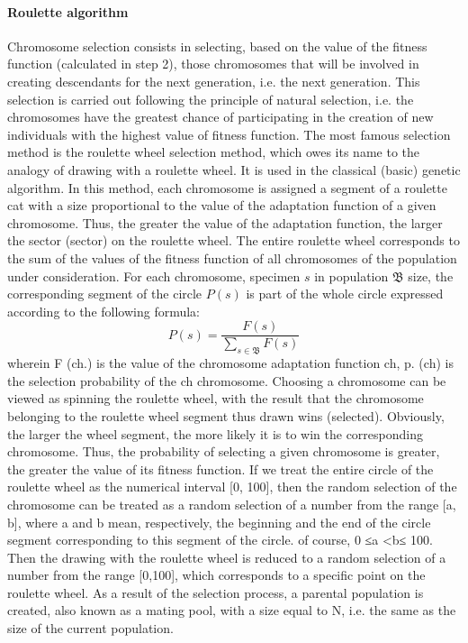 \paragraph{Roulette algorithm} 
Chromosome selection consists in selecting, based on the value of the fitness function 
(calculated in step 2), those chromosomes that will be involved in creating descendants for 
the next generation, i.e. the next generation. 
This selection is carried out following the principle of natural selection, i.e. the 
chromosomes have the greatest chance of participating in the creation of new individuals
with the highest value of fitness function. The most famous selection method is the roulette 
wheel selection method, which owes its name to the analogy of drawing with a roulette wheel. 
It is used in the classical (basic) genetic algorithm. In this method, each chromosome is 
assigned a segment of a roulette cat with a size proportional to the value of the adaptation 
function of a given chromosome. 
Thus, the greater the value of the adaptation function, the larger the sector (sector) on 
the roulette wheel. 
The entire roulette wheel corresponds to the sum of the values of the fitness function of 
all chromosomes of the population under consideration. For each chromosome, 
specimen $s$ in population $\mathfrak{B}$ size, the corresponding segment of the 
circle $P(s)$ is part of the whole circle expressed according to the following formula:
\begin{equation}
	P(s) = \frac{F(s)}{\sum_{s \in \mathfrak{B}}F(s)}
\end{equation}
wherein F (ch.) is the value of the chromosome adaptation function ch, p. (ch) is 
the selection probability of the ch chromosome. 
Choosing a chromosome can be viewed as spinning the roulette wheel, with the result that
the chromosome belonging to the roulette wheel segment thus drawn wins (selected). 
Obviously, the larger the wheel segment, the more likely it is to win the corresponding 
chromosome. 
Thus, the probability of selecting a given chromosome is greater, the greater the value 
of its fitness function. 
If we treat the entire circle of the roulette wheel as the numerical interval [0, 100], 
then the random selection of the chromosome can be treated as a random selection of a 
number from the range [a, b], where a and b mean, respectively, the beginning and the 
end of the circle segment corresponding to this segment of the circle. 
 of course, 0 ≤a <b≤ 100. Then the drawing with the roulette wheel is reduced to a 
 random selection of a number from the range [0,100], 
 which corresponds to a specific point on the roulette wheel. 
 As a result of the selection process, a parental population is created, also known as 
 a mating pool, with a size equal to N, i.e. the same as the size of the current population.


